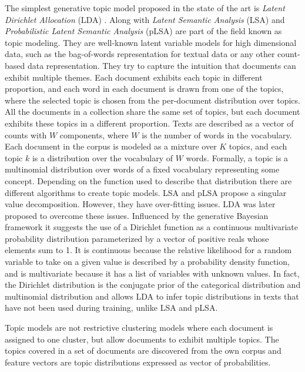 The simplest generative topic model proposed in the state of the art is \textit{Latent Dirichlet Allocation} (LDA) \citep{Blei2003}. Along with \textit{Latent Semantic Analysis} (LSA) \citep{Deerwester1990} and \textit{Probabilistic Latent Semantic Analysis} (pLSA) \citep{Hofmann2001} are part of the field known as topic modeling. They are well-known latent variable models for high dimensional data, such as the bag-of-words representation for textual data or any other count-based data representation. They try to capture the intuition that documents can exhibit multiple themes. Each document exhibits each topic in different proportion, and each word in each document is drawn from one of the topics, where the selected topic is chosen from the per-document distribution over topics. All the documents in a collection share the same set of topics, but each document exhibits these topics in a different proportion. Texts are described as a vector of counts with $W$ components, where $W$ is the number of words in the vocabulary. Each document in the corpus is modeled as a mixture over $K$ topics, and each topic $k$ is a distribution over the vocabulary of $W$ words. Formally, a topic is a multinomial distribution over words of a fixed vocabulary representing some concept. Depending on the function used to describe that distribution there are different algorithms to create topic models. LSA and pLSA propose a singular value decomposition. However, they have over-fitting issues. LDA was later proposed to overcome these issues. Influenced by the generative Bayesian framework it  suggests the use of a Dirichlet function as a continuous multivariate probability distribution parameterized by a vector of positive reals whose elements sum to 1.  It is continuous because the relative likelihood for a random variable to take on a given value is described by a probability density function, and is multivariate because it has a list of variables with unknown values. In fact, the Dirichlet distribution is the conjugate prior of the categorical distribution and multinomial distribution and allows LDA to infer topic distributions in texts that have not been used during training, unlike LSA and pLSA.

Topic models are not restrictive clustering models where each document is assigned to one cluster, but allow documents to exhibit multiple topics. The topics covered in a set of documents are discovered from the own corpus and feature vectors are topic distributions expressed as vector of probabilities.


